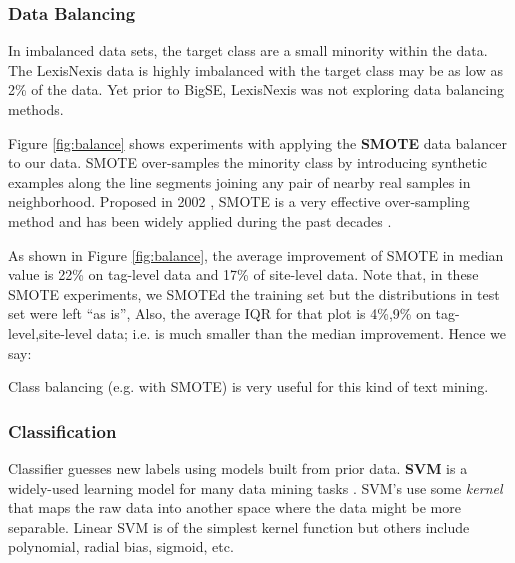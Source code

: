 \documentclass{sig-alternate-05-2015}
\theoremstyle{break}
\begin{document}
\subsubsection{Data Balancing}
\label{sect:Data Balancing}

In imbalanced data sets, the target class are a small minority within the data.
The LexisNexis data is highly imbalanced with the target class may be as low as 2\% of the
data. Yet prior to BigSE, LexisNexis was not exploring data balancing methods.

Figure \ref{fig:balance} shows  experiments with applying the \textbf{SMOTE} data
balancer to our data.
 SMOTE over-samples the minority class by introducing synthetic examples along the line segments joining any pair of nearby real samples in neighborhood.  Proposed in 2002 \cite{chawla2002smote}, SMOTE is a very effective over-sampling method and has been widely applied during the past decades \cite{han2005borderline,bunkhumpornpat2009safe,luengo2011addressing}. 

 
As shown in Figure \ref{fig:balance}, the average improvement of SMOTE in median value is 22\% on tag-level data and 17\% of site-level data. Note that, in these SMOTE experiments,
we SMOTEd the training set but the distributions in test set were left ``as is'',
Also, the average IQR for that plot is  4\%,9\% on tag-level,site-level data; i.e. is much smaller than the median
improvement. Hence we say:
\begin{lesson}
Class balancing (e.g. with SMOTE) is very useful for this kind of text mining.
\end{lesson}


\subsubsection{Classification}

Classifier guesses new labels using models built from prior data.
\textbf{SVM} is a widely-used learning model for  many data mining 
tasks \cite{joachims2006training,moharanatag}. SVM's use
some {\em kernel} that maps the raw data into another space where the data might be more
separable. 
Linear SVM is of the simplest kernel function but others include polynomial,
radial bias, sigmoid, etc.
 
\end{document}
